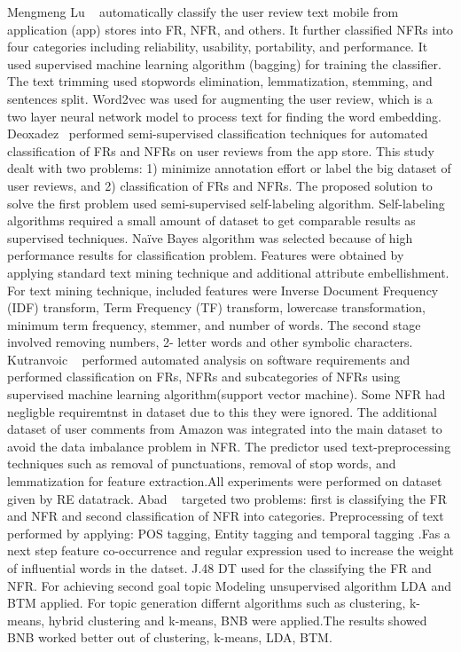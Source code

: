 Mengmeng Lu \etal~ \cite{Lu:2017} automatically classify the user review text mobile from application (app) stores  into FR, NFR, and others. It further classified NFRs into four categories including reliability, usability, portability, and performance. It used supervised machine learning algorithm (bagging) for training the classifier. The text trimming used stopwords elimination, lemmatization, stemming, and sentences split. Word2vec was used for augmenting the user review, which is a two layer neural network model to process text for finding the word embedding. Deoxadez \etal~\cite{Deocadez:2017}performed semi-supervised classification techniques for automated classification of FRs and NFRs on user reviews from the app store. This study dealt with two problems: 1) minimize annotation effort or label the big dataset of user reviews, and 2) classification of FRs and NFRs. The proposed solution to solve the first problem used semi-supervised self-labeling algorithm. Self-labeling algorithms required a small amount of dataset to get comparable results as supervised techniques. Naïve Bayes algorithm was selected because of high performance results for classification problem. Features were obtained by applying standard text mining technique and additional attribute embellishment. For text mining technique, included features were Inverse Document Frequency (IDF) transform, Term Frequency (TF) transform, lowercase transformation, minimum term frequency, stemmer, and number of words. The second stage involved removing numbers, 2- letter words and other symbolic characters. Kutranvoic \etal ~ \cite {Kurtanovic:2017}performed automated analysis on software requirements and performed classification on FRs, NFRs and subcategories of NFRs using supervised machine learning algorithm(support vector machine). Some NFR had negligble requiremtnst in dataset due to this they were ignored. The additional dataset of user comments from Amazon was integrated into the main dataset to avoid the data imbalance problem in NFR. The predictor used text-preprocessing techniques such as removal of punctuations, removal of stop words, and lemmatization for feature extraction.All experiments were performed on dataset given by RE datatrack.
 Abad \etal ~ \cite{Abad:2017} targeted two problems: first is classifying the FR and NFR and second classification of NFR into categories. Preprocessing of text performed by applying: POS tagging, Entity tagging and temporal tagging .Fas a next step feature co-occurrence and regular expression used to increase the weight of influential words in the datset. J.48 DT used for the classifying the FR and NFR. For achieving second goal topic Modeling unsupervised algorithm LDA and BTM applied. For topic generation differnt algorithms such as clustering, k-means, hybrid clustering and k-means, BNB were applied.The results showed BNB worked better out of clustering, k-means, LDA, BTM.
